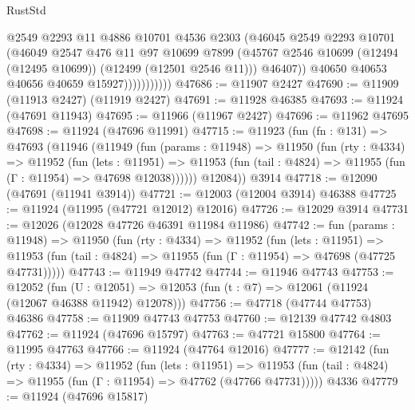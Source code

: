 \begin{lexlean}{RustStd}
\begin{coremodule}
                          @2549
                          @2293
                          @11
                          @4886
                          @10701
                          @4536
                          @2303
                          (@46045
                            @2549
                            @2293
                            @10701
                            (@46049
                              @2547
                              @476
                              @11
                              @97
                              @10699
                              @7899
                              (@45767
                                @2546
                                @10699
                                (@12494 (@12495 @10699))
                                (@12499 (@12501 @2546 @11)))
                              @46407))
                          @40650
                          @40653
                          @40656
                          @40659
                          @15927)))))))))))
@47686 := @11907 @2427
@47690 := @11909 (@11913 @2427) (@11919 @2427)
@47691 := @11928 @46385
@47693 := @11924 (@47691 @11943)
@47695 := @11966 (@11967 @2427)
@47696 := @11962 @47695
@47698 := @11924 (@47696 @11991)
@47715 := @11923
    (fun (fn : @131) =>
    @47693
      (@11946
        (@11949
          (fun (params : @11948) =>
          @11950
            (fun (rty : @4334) =>
            @11952
              (fun (lets : @11951) =>
              @11953 (fun (tail : @4824) => @11955 (fun (Γ : @11954) => @47698 @12038))))))
        @12084))
    @3914
@47718 := @12090 (@47691 (@11941 @3914))
@47721 := @12003 (@12004 @3914) @46388
@47725 := @11924 (@11995 (@47721 @12012) @12016)
@47726 := @12029 @3914
@47731 := @12026 (@12028 @47726 @46391 @11984 @11986)
@47742 := fun (params : @11948) =>
  @11950
    (fun (rty : @4334) =>
    @11952
      (fun (lets : @11951) =>
      @11953 (fun (tail : @4824) => @11955 (fun (Γ : @11954) => @47698 (@47725 @47731)))))
@47743 := @11949 @47742
@47744 := @11946 @47743
@47753 := @12052
    (fun (U : @12051) => @12053 (fun (t : @7) => @12061 (@11924 (@12067 @46388 @11942) @12078)))
@47756 := @47718 (@47744 @47753) @46386
@47758 := @11909 @47743 @47753
@47760 := @12139 @47742 @4803
@47762 := @11924 (@47696 @15797)
@47763 := @47721 @15800
@47764 := @11995 @47763
@47766 := @11924 (@47764 @12016)
@47777 := @12142
    (fun (rty : @4334) =>
    @11952
      (fun (lets : @11951) =>
      @11953 (fun (tail : @4824) => @11955 (fun (Γ : @11954) => @47762 (@47766 @47731)))))
    @4336
@47779 := @11924 (@47696 @15817)

\end{coremodule}
\end{lexlean}
